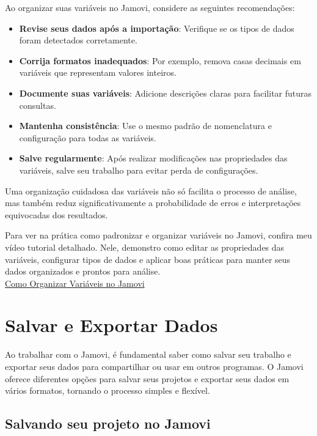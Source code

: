 Ao organizar suas variáveis no Jamovi, considere as seguintes recomendações:

\begin{itemize}
    \item \textbf{Revise seus dados após a importação}: Verifique se os tipos de dados foram detectados corretamente.
    \item \textbf{Corrija formatos inadequados}: Por exemplo, remova casas decimais em variáveis que representam valores inteiros.
    \item \textbf{Documente suas variáveis}: Adicione descrições claras para facilitar futuras consultas.
    \item \textbf{Mantenha consistência}: Use o mesmo padrão de nomenclatura e configuração para todas as variáveis.
    \item \textbf{Salve regularmente}: Após realizar modificações nas propriedades das variáveis, salve seu trabalho para evitar perda de configurações.
\end{itemize}

Uma organização cuidadosa das variáveis não só facilita o processo de análise, mas também reduz significativamente a probabilidade de erros e interpretações equivocadas dos resultados.

\begin{tcolorbox}[colback=white,colframe=red,title={\faPlayCircle \ Dica de Conteúdo}]
  Para ver na prática como padronizar e organizar variáveis no Jamovi, confira meu vídeo tutorial detalhado. Nele, demonstro como editar as propriedades das variáveis, configurar tipos de dados e aplicar boas práticas para manter seus dados organizados e prontos para análise.\\
  \textcolor{red}{\faYoutube} \href{https://youtu.be/PJkwPRLT_Q4?si=Ks8_3O7Ok5f-c6Bn}{Como Organizar Variáveis no Jamovi}
\end{tcolorbox}

\section{Salvar e Exportar Dados}

Ao trabalhar com o Jamovi, é fundamental saber como salvar seu trabalho e exportar seus dados para compartilhar ou usar em outros programas. O Jamovi oferece diferentes opções para salvar seus projetos e exportar seus dados em vários formatos, tornando o processo simples e flexível.

\subsection{Salvando seu projeto no Jamovi}

